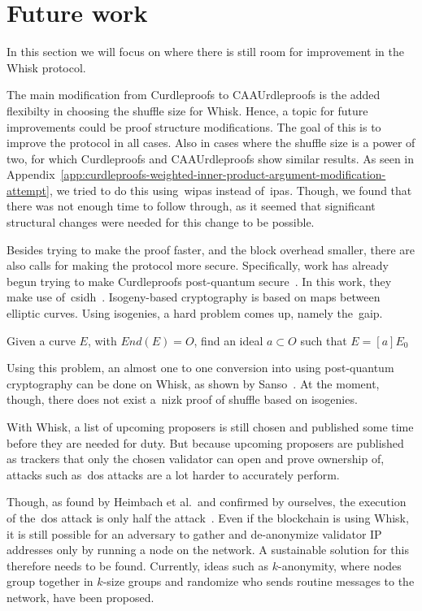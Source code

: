 \section{Future work}\label{sec:future-works}
In this section we will focus on where there is still room for improvement in the Whisk protocol.

The main modification from Curdleproofs to CAAUrdleproofs is the added flexibilty in choosing the shuffle size for Whisk.
Hence, a topic for future improvements could be proof structure modifications.
The goal of this is to improve the protocol in all cases.
Also in cases where the shuffle size is a power of two, for which Curdleproofs and CAAUrdleproofs show similar results.
As seen in Appendix~\ref{app:curdleproofs-weighted-inner-product-argument-modification-attempt}, we tried to do this using~\glspl{wipa} instead of~\glspl{ipa}.
Though, we found that there was not enough time to follow through, as it seemed that significant structural changes were needed for this change to be possible.


Besides trying to make the proof faster, and the block overhead smaller, there are also calls for making the protocol more secure.
Specifically, work has already begun trying to make Curdleproofs post-quantum secure~\cite{pqwhisk}.
In this work, they make use of~\gls{csidh}~\cite{10.1007/978-3-030-03332-3_15}.
Isogeny-based cryptography is based on maps between elliptic curves.
Using isogenies, a hard problem comes up, namely the~\gls{gaip}.
\begin{definition}
    Given a curve $E$, with $End(E)=O$, find an ideal $a\subset O$ such that $E=[a]E_0$
\end{definition}
Using this problem, an almost one to one conversion into using post-quantum cryptography can be done on Whisk, as shown by Sanso~\cite{pqwhisk}.
At the moment, though, there does not exist a~\gls{nizk} proof of shuffle based on isogenies.


With Whisk, a list of upcoming proposers is still chosen and published some time before they are needed for duty.
But because upcoming proposers are published as trackers that only the chosen validator can open and prove ownership of, attacks such as~\gls{dos} attacks are a lot harder to accurately perform.

Though, as found by Heimbach et al.~and confirmed by ourselves, the execution of the~\gls{dos} attack is only half the attack~\cite{heimbach2024deanonymizingethereumvalidatorsp2p,ouroldpaper}.
Even if the blockchain is using Whisk, it is still possible for an adversary to gather and de-anonymize validator IP addresses only by running a node on the network.
A sustainable solution for this therefore needs to be found.
Currently, ideas such as $k$-anonymity, where nodes group together in $k$-size groups and randomize who sends routine messages to the network, have been proposed.
